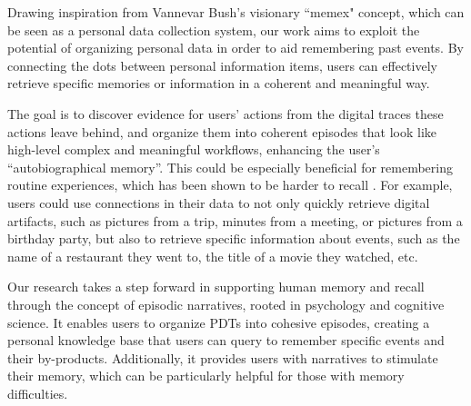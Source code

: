 \documentclass[11pt]{article}
\begin{document}
Drawing inspiration from Vannevar Bush's visionary ``memex" concept, which can be seen as a personal data collection system, our work aims to exploit the potential of organizing personal data in order to aid remembering past events. By connecting the dots between personal information items, users can effectively retrieve specific memories or information in a coherent and meaningful way.

The goal is to discover evidence for users' actions from the digital traces these actions leave behind, and organize them into coherent episodes that look like  high-level complex and meaningful workflows, enhancing the user's ``autobiographical memory''. This could be especially beneficial for remembering routine experiences, which has been shown to be harder to recall  \cite{bradburn1987answering}. For example, users could use connections in their data to not only quickly retrieve digital artifacts, such as pictures from a trip, minutes from a meeting, or pictures from a birthday party, but also to retrieve specific information about events, such as the name of a restaurant they went to,  the title of a movie they watched, etc.

Our research takes a step forward in supporting human memory and recall through the concept of episodic narratives, rooted in psychology and cognitive science. It enables users to organize PDTs into cohesive episodes, creating a personal knowledge base that users can query to remember specific events and their by-products. Additionally, it provides users with narratives to stimulate their memory, which can be particularly helpful for those with memory difficulties.
\end{document}

